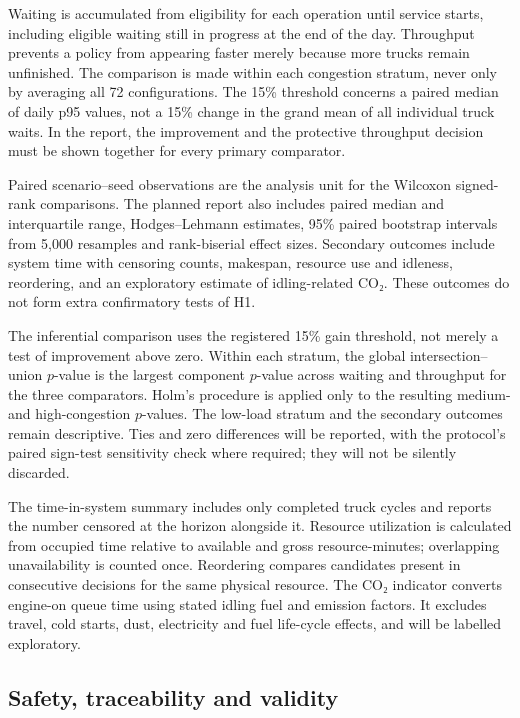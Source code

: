 \documentclass[12pt,a4paper]{article}
\begin{document}
Waiting is accumulated from eligibility for each operation until service starts, including eligible waiting still in progress at the end of the day. Throughput prevents a policy from appearing faster merely because more trucks remain unfinished. The comparison is made within each congestion stratum, never only by averaging all 72 configurations. The 15\% threshold concerns a paired median of daily p95 values, not a 15\% change in the grand mean of all individual truck waits. In the report, the improvement and the protective throughput decision must be shown together for every primary comparator.

Paired scenario–seed observations are the analysis unit for the Wilcoxon signed-rank comparisons. The planned report also includes paired median and interquartile range, Hodges–Lehmann estimates, 95\% paired bootstrap intervals from 5,000 resamples and rank-biserial effect sizes. Secondary outcomes include system time with censoring counts, makespan, resource use and idleness, reordering, and an exploratory estimate of idling-related CO₂. These outcomes do not form extra confirmatory tests of H1.

The inferential comparison uses the registered 15\% gain threshold, not merely a test of improvement above zero. Within each stratum, the global intersection–union $p$-value is the largest component $p$-value across waiting and throughput for the three comparators. Holm's procedure is applied only to the resulting medium- and high-congestion $p$-values. The low-load stratum and the secondary outcomes remain descriptive. Ties and zero differences will be reported, with the protocol's paired sign-test sensitivity check where required; they will not be silently discarded.

The time-in-system summary includes only completed truck cycles and reports the number censored at the horizon alongside it. Resource utilization is calculated from occupied time relative to available and gross resource-minutes; overlapping unavailability is counted once. Reordering compares candidates present in consecutive decisions for the same physical resource. The CO₂ indicator converts engine-on queue time using stated idling fuel and emission factors. It excludes travel, cold starts, dust, electricity and fuel life-cycle effects, and will be labelled exploratory.

\subsection{Safety, traceability and validity}
\end{document}
